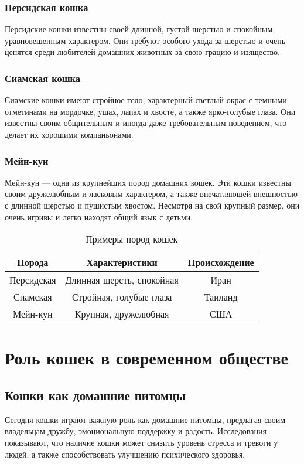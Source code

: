 \documentclass{report}
\begin{document}
\subsection{Персидская кошка}
Персидские кошки известны своей длинной, густой шерстью и спокойным, уравновешенным характером. Они требуют особого ухода за шерстью и очень ценятся среди любителей домашних животных за свою грацию и изящество.

\subsection{Сиамская кошка}
Сиамские кошки имеют стройное тело, характерный светлый окрас с темными отметинами на мордочке, ушах, лапах и хвосте, а также ярко-голубые глаза. Они известны своим общительным и иногда даже требовательным поведением, что делает их хорошими компаньонами.

\subsection{Мейн-кун}
Мейн-кун — одна из крупнейших пород домашних кошек. Эти кошки известны своим дружелюбным и ласковым характером, а также впечатляющей внешностью с длинной шерстью и пушистым хвостом. Несмотря на свой крупный размер, они очень игривы и легко находят общий язык с детьми.

\begin{table}[h]
    \centering
    \begin{tabular}{|c|c|c|}
    \hline
    Порода & Характеристики & Происхождение \\
    \hline
    Персидская & Длинная шерсть, спокойная & Иран \\
    \hline
    Сиамская & Стройная, голубые глаза & Таиланд \\
    \hline
    Мейн-кун & Крупная, дружелюбная & США \\
    \hline
    \end{tabular}
    \caption{Примеры пород кошек}
    \label{tab:example}
\end{table}

\chapter{Роль кошек в современном обществе}

\section{Кошки как домашние питомцы}
Сегодня кошки играют важную роль как домашние питомцы, предлагая своим владельцам дружбу, эмоциональную поддержку и радость. Исследования показывают, что наличие кошки может снизить уровень стресса и тревоги у людей, а также способствовать улучшению психического здоровья.
\end{document}
